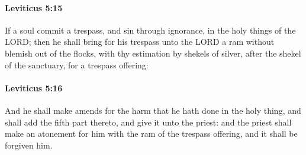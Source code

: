 		\paragraph{Leviticus 5:15} %
			\label{LEVITICUS-5-15}

			If a soul commit a trespass, and sin through ignorance, in the holy things of the LORD; then he shall bring for his trespass unto the LORD a ram without blemish out of the flocks, with thy estimation by shekels of silver, after the shekel of the sanctuary, for a trespass offering:


		\paragraph{Leviticus 5:16} %
			\label{LEVITICUS-5-16}

			And he shall make amends for the harm that he hath done in the holy thing, and shall add the fifth part thereto, and give it unto the priest: and the priest shall make an atonement for him with the ram of the trespass offering, and it shall be forgiven him.

